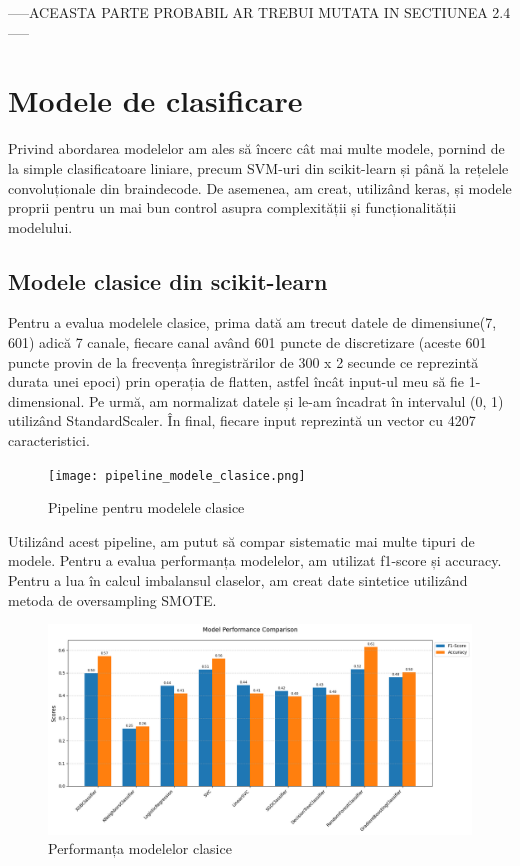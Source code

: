 -----ACEASTA PARTE PROBABIL AR TREBUI MUTATA IN SECTIUNEA 2.4-----

\section{Modele de clasificare}
Privind abordarea modelelor am ales să încerc cât mai multe modele, pornind de la simple clasificatoare liniare, precum SVM-uri din scikit-learn\cite{scikit-learn} și până la rețelele convoluționale din braindecode\cite{braindecode}. De asemenea, am creat, utilizând keras\cite{keras}, și modele proprii pentru un mai bun control asupra complexității și funcționalității modelului.
\subsection{Modele clasice din scikit-learn}
Pentru a evalua modelele clasice, prima dată am trecut datele de dimensiune(7, 601) adică 7 canale, fiecare canal având 601 puncte de discretizare (aceste 601 puncte provin de la frecvența înregistrărilor de 300 x 2 secunde ce reprezintă durata unei epoci) prin operația de flatten, astfel încât input-ul meu să fie 1-dimensional. Pe urmă, am normalizat datele și le-am încadrat în intervalul (0, 1) utilizând StandardScaler. În final, fiecare input reprezintă un vector cu 4207 caracteristici.

\vspace{1em}
\begin{figure}[h]
    \centering
    \texttt{[image: pipeline\_modele\_clasice.png]}
    \caption{Pipeline pentru modelele clasice}
    \label{fig:enter-label}
\end{figure}

Utilizând acest pipeline, am putut să compar sistematic mai multe tipuri de modele. Pentru a evalua performanța modelelor, am utilizat f1-score și accuracy. Pentru a lua în calcul imbalansul claselor, am creat date sintetice utilizând metoda de oversampling SMOTE. %

\vspace{1em}
\begin{figure}[h]
    \centering
    \includegraphics[width=1\textwidth]{images/comparatie_modele_clasice_unweighted.png}
    \caption{Performanța modelelor clasice}
    \label{fig:enter-label}
\end{figure}

